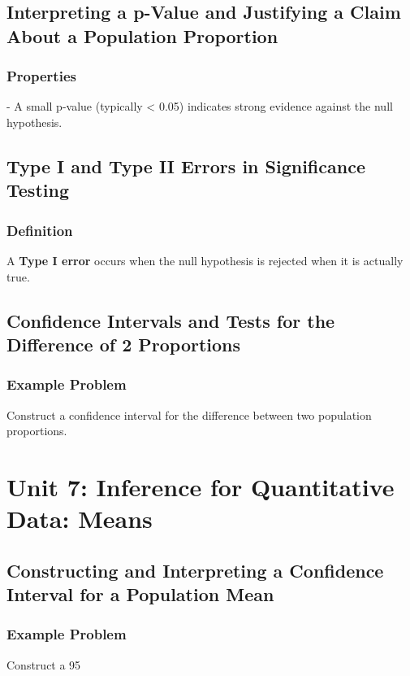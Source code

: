\subsection{Interpreting a p-Value and Justifying a Claim About a Population Proportion}
\subsubsection{Properties}
\begin{properties}
- A small p-value (typically < 0.05) indicates strong evidence against the null hypothesis.
\end{properties}

\subsection{Type I and Type II Errors in Significance Testing}
\subsubsection{Definition}
\begin{definition}
A \textbf{Type I error} occurs when the null hypothesis is rejected when it is actually true.
\end{definition}

\subsection{Confidence Intervals and Tests for the Difference of 2 Proportions}
\subsubsection{Example Problem}
\begin{example}
Construct a confidence interval for the difference between two population proportions.
\end{example}

\section{Unit 7: Inference for Quantitative Data: Means}
\subsection{Constructing and Interpreting a Confidence Interval for a Population Mean}
\subsubsection{Example Problem}
\begin{example}
Construct a 95%
\end{example}


